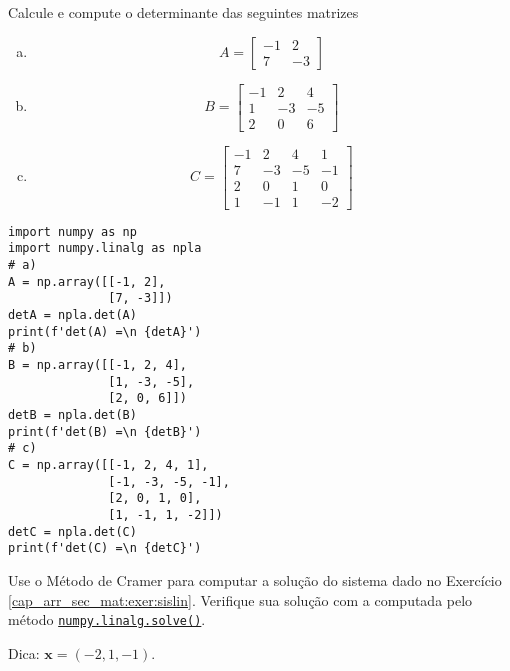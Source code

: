 \begin{exer}
  Calcule e compute o determinante das seguintes matrizes
  \begin{enumerate}[a)]
  \item
    \begin{equation}
      A =
      \begin{bmatrix}
        -1 & 2\\
        7 & -3
      \end{bmatrix}
    \end{equation}
  \item
    \begin{equation}
      B =
      \begin{bmatrix}
        -1 & 2 & 4\\
        1 & -3 & -5\\
        2 & 0 & 6
      \end{bmatrix}
    \end{equation}
  \item
    \begin{equation}
      C =
      \begin{bmatrix}
        -1 & 2 & 4 & 1\\
        7 & -3 & -5 & -1\\
        2 & 0 & 1 & 0\\
        1 & -1 & 1 & -2
      \end{bmatrix}
    \end{equation}
  \end{enumerate}
\end{exer}
\begin{resp}
\begin{lstlisting}
import numpy as np
import numpy.linalg as npla
# a)
A = np.array([[-1, 2],
              [7, -3]])
detA = npla.det(A)
print(f'det(A) =\n {detA}')
# b)
B = np.array([[-1, 2, 4],
              [1, -3, -5],
              [2, 0, 6]])
detB = npla.det(B)
print(f'det(B) =\n {detB}')
# c)
C = np.array([[-1, 2, 4, 1],
              [-1, -3, -5, -1],
              [2, 0, 1, 0],
              [1, -1, 1, -2]])
detC = npla.det(C)
print(f'det(C) =\n {detC}')
\end{lstlisting}
\end{resp}

\begin{exer}
  Use o Método de Cramer para computar a solução do sistema dado no Exercício \ref{cap_arr_sec_mat:exer:sislin}. Verifique sua solução com a computada pelo método \href{https://numpy.org/doc/stable/reference/generated/numpy.linalg.solve.html}{\lstinline+numpy.linalg.solve()+}.
\end{exer}
\begin{resp}
  Dica: $\pmb{x} = (-2, 1, -1)$.
\end{resp}

